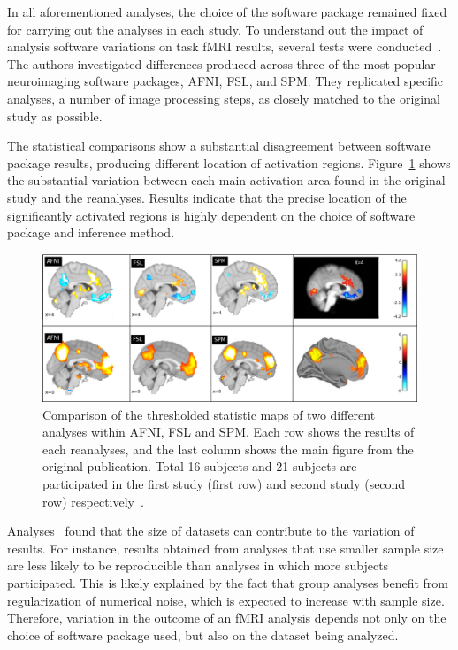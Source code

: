 In all aforementioned analyses, the choice of the software package 
remained fixed for carrying out the analyses in each study. To understand 
out the impact of analysis software variations on task fMRI results, 
several tests were conducted~\cite{bowring2019exploring}. The authors 
investigated differences produced across three of the most popular 
neuroimaging software packages, AFNI, FSL, and SPM. They replicated 
specific analyses, a number of image processing steps, as closely 
matched to the original study as possible. 

The statistical comparisons show a substantial disagreement between 
software package results, producing different location of 
activation regions. 
Figure~\ref{inter_sfw} shows the substantial variation 
between each main activation area found in the original study and the 
reanalyses. Results indicate that the precise location of the significantly 
activated regions is highly dependent on the choice of software package 
and inference method.

\begin{figure}[H]
\centering
	\includegraphics[scale=0.5]{chapters/background/images/inter_sfw} 
	\caption{Comparison of the thresholded statistic maps of two 
	different analyses within AFNI, FSL and SPM. Each row shows the 
	results of each reanalyses, and the last column shows the main 
	figure from the original publication. Total 16 subjects and 21 
	subjects are participated in the first study (first row) and second 
	study (second row) respectively~\cite{bowring2019exploring}.
	\label{inter_sfw}}
\end{figure}

Analyses~\cite{bowring2019exploring} found that the size of datasets 
can contribute to the variation of results. For instance, results 
obtained from analyses that use smaller sample size are less likely to 
be reproducible than analyses in which more subjects participated.
This is likely explained by the fact that group analyses benefit from
regularization of numerical noise, which is expected to increase with sample size. 
Therefore, variation in the outcome of an fMRI analysis depends not 
only on the choice of software package used, but also on the dataset 
being analyzed. 

